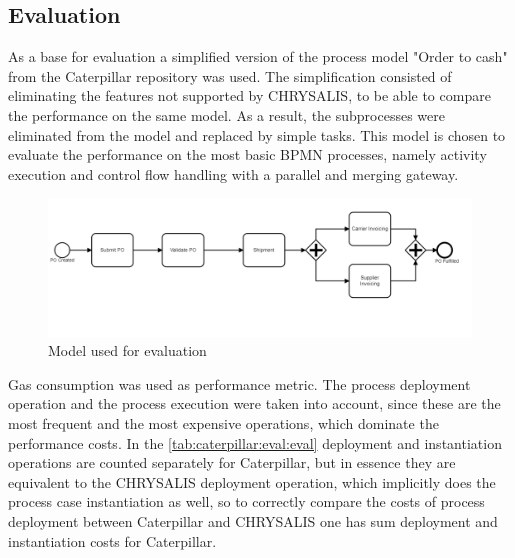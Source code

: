 \subsection{Evaluation}
\label{sec:caterpillar:eval:eval}

As a base for evaluation a simplified version of the process model "Order to cash" from the Caterpillar repository was used. The simplification consisted of eliminating the features not supported by CHRYSALIS, to be able to compare the performance on the same model. As a result, the subprocesses were eliminated from the model and replaced by simple tasks. This model is chosen to evaluate the performance on the most basic BPMN processes, namely activity execution and control flow handling with a parallel and merging gateway.

\begin{figure}[hbt]
	\includegraphics[width=\textwidth]{gfx/caterpillar-eval-model}
	\caption{Model used for evaluation}
	\label{fig:caterpillar:eval:model}
\end{figure}

Gas consumption was used as  performance metric. The process deployment operation and the process execution were taken into account, since these are the most frequent and the most expensive operations, which dominate the performance costs. In the \ref{tab:caterpillar:eval:eval} deployment and instantiation operations are counted separately for Caterpillar, but in essence they are equivalent to the CHRYSALIS deployment operation, which implicitly does the process case instantiation as well, so to correctly compare the costs of process deployment between Caterpillar and CHRYSALIS one has sum deployment and instantiation costs for Caterpillar.

